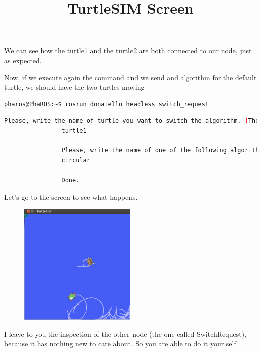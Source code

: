 \documentclass[a4paper,10pt,twoside]{book}
\begin{document}
			
			We can see how the turtle1 and the turtle2 are both connected to our node, just as expected.
			
			
			\newpage
			
			Now, if we execute again the command and we send and algorithm for the default turtle, we should have the two turtles moving
			
			
			
			\begin{lstlisting}[language=bash,title={Starting up Donatello/SwitchRequest}]
				pharos@PhaROS:~$ rosrun donatello headless switch_request
			\end{lstlisting}
			
			\begin{lstlisting}[language=bash,title={Starting up Donatello/SwitchRequest - Interactive Output }]
				Please, write the name of turtle you want to switch the algorithm. (The default one is called turtle1) 
				turtle1

				Please, write the name of one of the following algorithms  #('random' 'quiet' 'pursuiter' 'circular' 'pharo')
				circular
				
				Done.
			\end{lstlisting}
			
			
			Let's go to the screen to see what happens.
			
			
			
			\begin{figure}[!htbp]
  		
  				\centering
    				\includegraphics[width=0.5\textwidth]{TurtleSIM1Circular1Random.png}
				
				\centering
				\title{TurtleSIM Screen}
			\end{figure}
			
			
			I leave to you the inspection of the other node  (the one called SwitchRequest), because it has nothing new to care about. So you are able to do it your self. 
			
\end{document}
